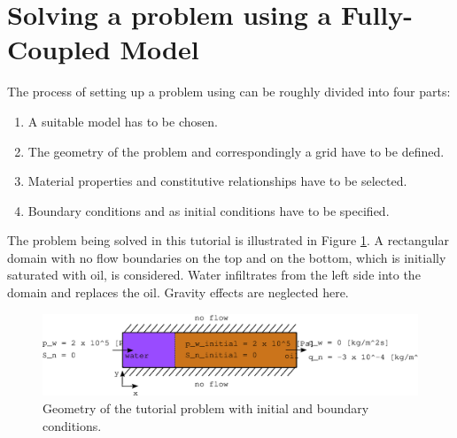 \section[Fully-coupled model]{Solving a problem using a Fully-Coupled Model}\label{tutorial-coupled}

The process of setting up a problem using \Dumux can be roughly divided into four parts:
\begin{enumerate}
 \item A suitable model has to be chosen.
 \item The geometry of the problem and correspondingly a grid have to be defined.
 \item Material properties and constitutive relationships have to be selected.
 \item Boundary conditions and as initial conditions have to be specified.
\end{enumerate}

The problem being solved in this tutorial is illustrated in Figure \ref{tutorial-coupled:problemfigure}. 
A rectangular domain with no flow boundaries on the top and on the bottom, which is initially saturated with oil, is considered. 
Water infiltrates from the left side into the domain and replaces the oil. Gravity effects are neglected here.

\begin{figure}[ht]
\centering
\includegraphics[width=0.9\linewidth,keepaspectratio]{EPS/tutorial-problemconfiguration}
\caption{Geometry of the tutorial problem with initial and boundary conditions.}\label{tutorial-coupled:problemfigure}
\end{figure}

